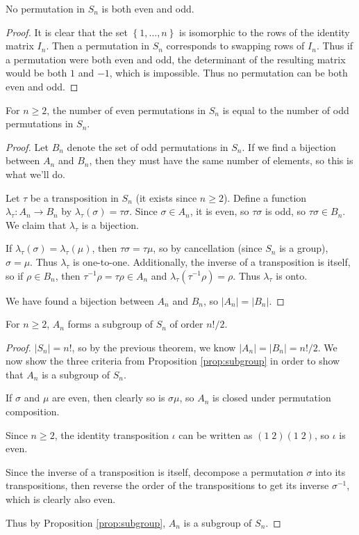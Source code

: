 \documentclass[10pt]{report}
\begin{document}
\begin{thrm}{}{}
No permutation in $S_n$ is both even and odd. 
\end{thrm}
\begin{proof}
	It is clear that the set $\left\{ 1,\dots, n \right\}$ is isomorphic to the rows of the identity matrix $I_n$. Then a permutation in $S_n$ corresponds to swapping rows of $I_n$. Thus if a permutation were both even and odd, the determinant of the resulting matrix would be both $1$ and $-1$, which is impossible. Thus no permutation can be both even and odd.
\end{proof}

\begin{thrm}{}{}
For $n\geq 2$, the number of even permutations in $S_n$ is equal to the number of odd permutations in $S_n$.
\end{thrm}
\begin{proof}
	Let $B_n$ denote the set of odd permutations in $S_n$. If we find a bijection between $A_n$ and $B_n$, then they must have the same number of elements, so this is what we'll do.

	Let $\tau$ be a transposition in $S_n$ (it exists since $n \geq 2$). Define a function $\lambda_{\tau}:A_n \to  B_n$ by $\lambda_{\tau}(\sigma) = \tau \sigma$. Since $\sigma \in A_n$, it is even, so $\tau \sigma$ is odd, so $\tau \sigma \in B_n$. We claim that $\lambda_{\tau}$ is a bijection.

	If $\lambda_{\tau}(\sigma) = \lambda_{\tau}(\mu)$, then $\tau \sigma = \tau \mu$, so by cancellation (since $S_n$ is a group), $\sigma = \mu$. Thus $\lambda_{\tau}$ is one-to-one. Additionally, the inverse of a transposition is itself, so if $\rho \in B_n$, then $\tau^{-1}\rho = \tau \rho \in A_n$ and $\lambda_{\tau}(\tau^{-1}\rho) = \rho$. Thus $\lambda_{\tau}$ is onto.

	We have found a bijection between $A_n$ and $B_n$, so $|A_n| = |B_n|$.
\end{proof}

\begin{thrm}{}{}
For $n\geq 2$, $A_n$ forms a subgroup of $S_n$ of order $n!/2$.
\end{thrm}
\begin{proof}
	$|S_n|=n!$, so by the previous theorem, we know $|A_n|=|B_n|=n!/2$. We now show the three criteria from Proposition \ref{prop:subgroup} in order to show that $A_n$ is a subgroup of $S_n$.

	If $\sigma$ and $\mu$ are even, then clearly so is $\sigma \mu$, so $A_n$ is closed under permutation composition.

	Since $n\geq 2$, the identity transposition $\iota$ can be written as $(1\;2)(1\;2)$, so $\iota$ is even.

	Since the inverse of a transposition is itself, decompose a permutation $\sigma$ into its transpositions, then reverse the order of the transpositions to get its inverse $\sigma^{-1}$, which is clearly also even.

	Thus by Proposition \ref{prop:subgroup}, $A_n$ is a subgroup of $S_n$.
\end{proof}
\end{document}
